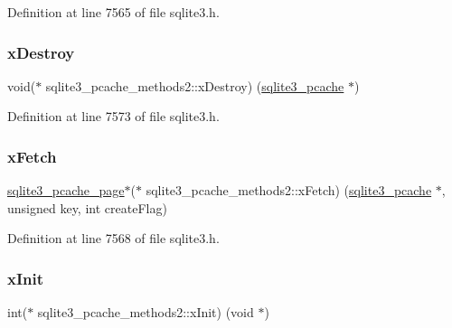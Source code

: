 Definition at line 7565 of file sqlite3.\+h.

\mbox{\label{structsqlite3__pcache__methods2_a17a43db31d015c29e44d68c752682365}} 
\subsubsection{\texorpdfstring{x\+Destroy}{xDestroy}}
{\footnotesize\ttfamily void($\ast$ sqlite3\+\_\+pcache\+\_\+methods2\+::x\+Destroy) (\mbox{\hyperlink{sqlite3_8h_a096c453d937d51f7926d7d31c8e0bd2f}{sqlite3\+\_\+pcache}} $\ast$)}



Definition at line 7573 of file sqlite3.\+h.

\mbox{\label{structsqlite3__pcache__methods2_a6283d91a6ad5037fad33003c2198c9f7}} 
\subsubsection{\texorpdfstring{x\+Fetch}{xFetch}}
{\footnotesize\ttfamily \mbox{\hyperlink{structsqlite3__pcache__page}{sqlite3\+\_\+pcache\+\_\+page}}$\ast$($\ast$ sqlite3\+\_\+pcache\+\_\+methods2\+::x\+Fetch) (\mbox{\hyperlink{sqlite3_8h_a096c453d937d51f7926d7d31c8e0bd2f}{sqlite3\+\_\+pcache}} $\ast$, unsigned key, int create\+Flag)}



Definition at line 7568 of file sqlite3.\+h.

\mbox{\label{structsqlite3__pcache__methods2_a21f7fdd82d029d3b0567c573c012adfc}} 
\subsubsection{\texorpdfstring{x\+Init}{xInit}}
{\footnotesize\ttfamily int($\ast$ sqlite3\+\_\+pcache\+\_\+methods2\+::x\+Init) (void $\ast$)}



